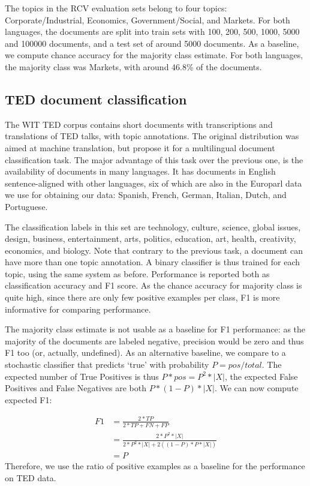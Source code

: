 The topics in the RCV evaluation sets belong to four topics: Corporate/Industrial, Economics, Government/Social, and Markets.
For both languages, the documents are split into train sets with 100, 200, 500, 1000, 5000 and 100000 documents, and a test set of around 5000 documents.
As a baseline, we compute chance accuracy for the majority class estimate. For both languages, the majority class was Markets, with around 46.8\% of the documents.

\subsection{TED document classification}
The WIT TED corpus \cite{cettolo2012} contains short documents with transcriptions and translations of TED talks, with topic annotations. The original distribution was aimed at machine translation, but \cite{hermann2014multilingual} propose it for a multilingual document classification task. The major advantage of this task over the previous one, is the availability of documents in many languages. It has documents in English sentence-aligned with other languages, six of which are also in the Europarl data we use for obtaining our data: Spanish, French, German, Italian, Dutch, and Portuguese.

The classification labels in this set are technology, culture, science, global issues, design, business, entertainment, arts, politics, education, art, health, creativity, economics, and biology. Note that contrary to the previous task, a document can have more than one topic annotation. A binary classifier is thus trained for each topic, using the same system as before. Performance is reported both as classification accuracy and F1 score. As the chance accuracy for majority class is quite high, since there are only few positive examples per class, F1 is more informative for comparing performance. 

The majority class estimate is not usable as a baseline for F1 performance: as the majority of the documents are labeled negative, precision would be zero and thus F1 too (or, actually, undefined). As an alternative baseline, we compare to a stochastic classifier that predicts `true' with probability $P=pos/total$. The expected number of True Positives is thus $P*pos=P^2*|X|$, the expected False Positives and False Negatives are both $P*(1-P)*|X|$. We can now compute expected F1:

\begin{align*}
F1	&=\frac{2*TP}{2*TP+FN+FP}\\
			&=\frac{2*P^2*|X|}{2*P^2*|X|+2((1-P)*P*|X|)}\\
			&=P
\end{align*} Therefore, we use the ratio of positive examples as a baseline for the performance on TED data.






